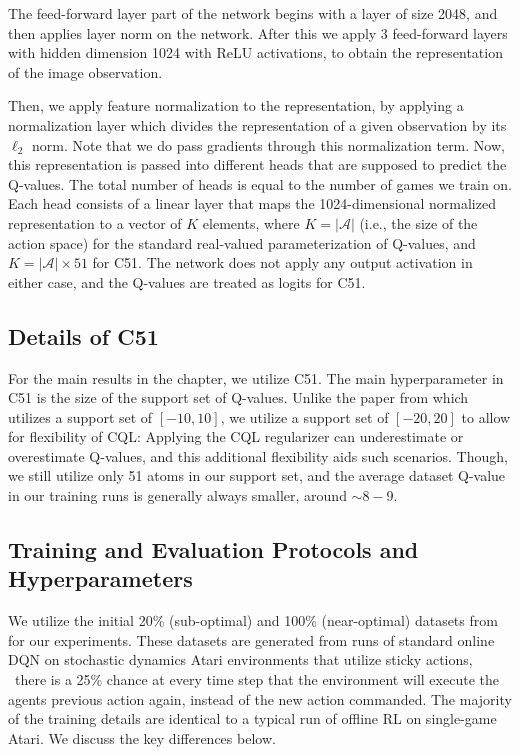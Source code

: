 The feed-forward layer part of the network begins with a layer of size 2048, and then applies layer norm on the network. After this we apply 3 feed-forward layers with hidden dimension 1024 with ReLU activations, to obtain the representation of the image observation. 

Then, we apply feature normalization to the representation, by applying a normalization layer which divides the representation of a given observation by its $\ell_2$ norm. Note that we do pass gradients through this normalization term. Now, this representation is passed into different heads that are supposed to predict the Q-values. 
The total number of heads is equal to the number of games we train on. Each head consists of a linear layer that maps the 1024-dimensional normalized representation to a vector of $K$ elements, where $K = |\mathcal{A}|$ (i.e., the size of the action space) for the standard real-valued parameterization of Q-values, and $K = |\mathcal{A}| \times 51$ for C51. The network does not apply any output activation in either case, and the Q-values are treated as logits for C51.  

\subsection{Details of C51}
\label{sec:c51_details}

For the main results in the chapter, we utilize C51. The main hyperparameter in C51 is the size of the support set of Q-values. Unlike the paper from \citet{bellemare2017distributional} which utilizes a support set of $[-10, 10]$, we utilize a support set of $[-20, 20]$ to allow for flexibility of CQL: Applying the CQL regularizer can underestimate or overestimate Q-values, and this additional flexibility aids such scenarios. Though, we still utilize only 51 atoms in our support set, and the average dataset Q-value in our training runs is generally always smaller, around $\sim 8-9$.

\subsection{Training and Evaluation Protocols and Hyperparameters}

We utilize the initial 20\% (sub-optimal) and 100\% (near-optimal) datasets from \citet{agarwal2019optimistic} for our experiments. These datasets are generated from runs of standard online DQN on stochastic dynamics Atari environments that utilize sticky actions, \ie\ there is a 25\% chance at every time step that the environment will execute the agents previous action again, instead of the new action commanded. The majority of the training details are identical to a typical run of offline RL on single-game Atari. We discuss the key differences below. 


